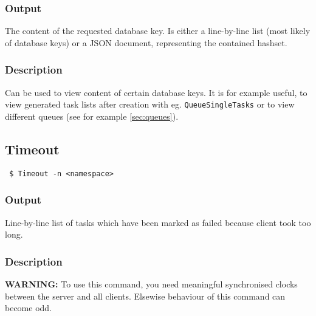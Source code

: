 \documentclass[a4paper,11pt]{article}
\begin{document}
\subsubsection{Output}
The content of the requested database key. Is either a line-by-line list (most likely of database keys) or a JSON document, representing the contained hashset.

\subsubsection{Description}
Can be used to view content of certain database keys. It is for example useful, to view generated task lists after creation with eg. \texttt{QueueSingleTasks} or to view different queues (see for example \ref{sec:queues}).


\newpage

\subsection{Timeout\label{cmd:timeout}}
\begin{verbatim}
 $ Timeout -n <namespace>
\end{verbatim}

\subsubsection{Output}
Line-by-line list of tasks which have been marked as failed because client took too long.

\subsubsection{Description}
\textbf{WARNING:} To use this command, you need meaningful synchronised clocks between the server and all clients. Elsewise behaviour of this command can become odd.

%
%
%
%



%
%
%
%
\end{document}
